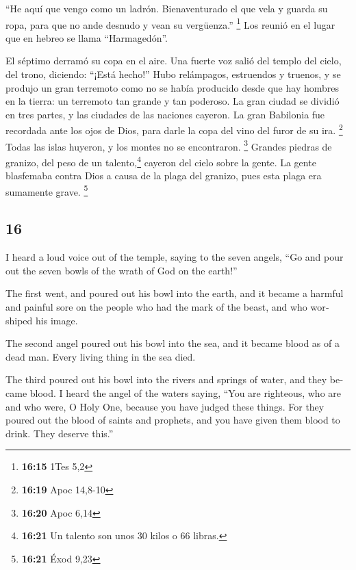 \begin{paracol}{2}
 ``He aquí que vengo como un ladrón. Bienaventurado el
que vela y guarda su ropa, para que no ande desnudo y vean su
vergüenza.'' \footnote{\textbf{16:15} 1Tes 5,2}  Los
reunió en el lugar que en hebreo se llama ``Harmagedón''.

 El séptimo derramó su copa en el aire. Una fuerte voz
salió del templo del cielo, del trono, diciendo: ``¡Está hecho!''
 Hubo relámpagos, estruendos y truenos, y se produjo un
gran terremoto como no se había producido desde que hay hombres en la
tierra: un terremoto tan grande y tan poderoso.  La gran
ciudad se dividió en tres partes, y las ciudades de las naciones
cayeron. La gran Babilonia fue recordada ante los ojos de Dios, para
darle la copa del vino del furor de su ira. \footnote{\textbf{16:19}
  Apoc 14,8-10}  Todas las islas huyeron, y los montes no
se encontraron. \footnote{\textbf{16:20} Apoc 6,14} 
Grandes piedras de granizo, del peso de un talento,\footnote{\textbf{16:21}
  Un talento son unos 30 kilos o 66 libras.} cayeron del cielo sobre la
gente. La gente blasfemaba contra Dios a causa de la plaga del granizo,
pues esta plaga era sumamente grave. \footnote{\textbf{16:21} Éxod 9,23}

\switchcolumn
\begin{otherlanguage}{english}

\hypertarget{section-31}{%
\section{16}\label{section-31}}

 I heard a loud voice out of the temple, saying to the
seven angels, ``Go and pour out the seven bowls of the wrath of God on
the earth!''

 The first went, and poured out his bowl into the earth,
and it became a harmful and painful sore on the people who had the mark
of the beast, and who worshiped his image.

 The second angel poured out his bowl into the sea, and it
became blood as of a dead man. Every living thing in the sea died.

 The third poured out his bowl into the rivers and springs
of water, and they became blood.  I heard the angel of the
waters saying, ``You are righteous, who are and who were, O Holy One,
because you have judged these things.  For they poured out
the blood of saints and prophets, and you have given them blood to
drink. They deserve this.''


\end{otherlanguage}
\end{paracol}
